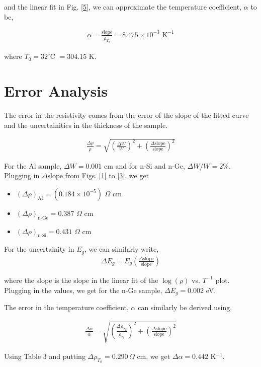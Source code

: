 \noindent and the linear fit in Fig. \ref{5}, we can approximate the temperature coefficient, $\alpha$ to be,

\begin{align*}
    \alpha = \frac{\text{slope}}{\rho_{T_0}} = 8.475 \times 10^{-3} \text{ K}^{-1}
\end{align*}

\noindent where $T_0=32^\circ$C $=304.15$ K.

\section{Error Analysis}
The error in the resistivity comes from the error of the slope of the fitted curve and the uncertainities in the thickness of the sample.

\begin{align}
    \frac{\Delta \rho}{\rho} = \sqrt{\left(\frac{\Delta W}{W}\right)^2 + \left(\frac{\Delta \text{slope}}{\text{slope}}\right)^2}
\end{align}

For the Al sample, $\Delta W = 0.001$ cm and for n-Si and n-Ge, $\Delta W/W = 2\%$. Plugging in $\Delta \text{slope}$ from Figs. \ref{1} to \ref{3}, we get

\begin{itemize}
    \item $(\Delta \rho)_\text{Al} = (0.184 \times 10^{-5})\,\,\Omega$ cm 
    \item $(\Delta \rho)_\text{n-Ge} = 0.387\,\,\Omega$ cm 
    \item $(\Delta \rho)_\text{n-Si} = 0.431\,\,\Omega$ cm 
\end{itemize}

\noindent For the uncertainity in $E_g$, we can similarly write,
\begin{align}
    \Delta E_g = E_g\left(\frac{\Delta \text{slope}}{\text{slope}}\right)
\end{align}

\noindent where the slope is the slope in the linear fit of the $\log(\rho)$ vs. $T^{-1}$ plot. Plugging in the values, we get for the n-Ge sample, $\Delta E_g=0.002$ eV.

The error in the temperature coefficient, $\alpha$ can similarly be derived using,

\begin{align}
    \frac{\Delta \alpha}{\alpha} = \sqrt{\left(\frac{\Delta \rho_{T_0}}{\rho_{T_0}}\right)^2 + \left(\frac{\Delta \text{slope}}{\text{slope}}\right)^2}
\end{align}

\noindent Using Table 3 and putting $\Delta \rho_{T_0}=0.290\,\Omega$ cm, we get $\Delta \alpha = 0.442$ K$^{-1}$.

